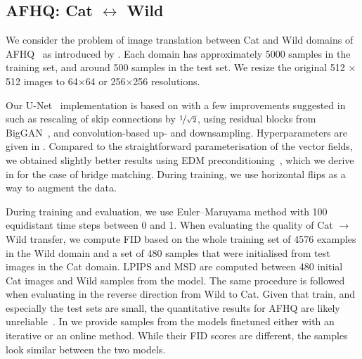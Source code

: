 \documentclass{article}
\begin{document}
\subsection{AFHQ: Cat $\leftrightarrow$ Wild}
\label{sec:experimental_details_afhq}

We consider the problem of image translation between Cat and Wild domains of AFHQ~ as introduced by \cite{shi2023DSBM}. Each domain has approximately 5000 samples in the training set, and around 500 samples in the test set. We resize the original 512 $\times$ 512 images to 64$\times$64 or 256$\times$256 resolutions. 

Our U-Net~\citep{unet} implementation is based on \cite{ho_denoising_2020} with a few improvements suggested in \cite{dhariwal2021diffusion, song2020score} such as rescaling of skip connections by $\nicefrac{1}{\sqrt{2}}$, using residual blocks from BigGAN~\citep{brock2018large}, and convolution-based up- and downsampling. Hyperparameters are given in .
Compared to the straightforward parameterisation of the vector fields, we obtained slightly better results using EDM preconditioning~\cite{karras2022elucidating}, which we derive in  for the case of bridge matching. 
During training, we use horizontal flips as a way to augment the data.  

During training and evaluation, we use Euler–Maruyama method with 100 equidistant time steps between 0 and 1. When evaluating the quality of Cat $\rightarrow$ Wild transfer, we compute FID based on the whole training set of 4576 examples in the Wild domain and a set of 480 samples that were initialised from test images in the Cat domain. LPIPS and MSD are computed between 480 initial Cat images and Wild samples from the model. The same procedure is followed when evaluating in the reverse direction from Wild to Cat. Given that train, and especially the test sets are small, the quantitative results for AFHQ are likely unreliable~\citep{unbiased_fid}. In  we provide samples from the models finetuned either with an iterative or an online method. While their FID scores are different, the samples look similar between the two models.  
\end{document}

